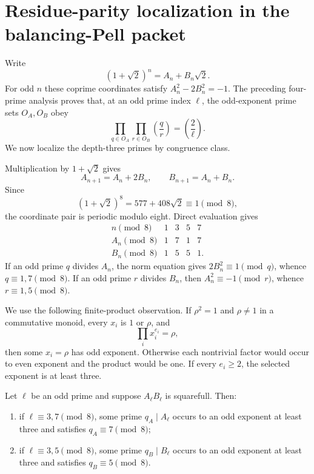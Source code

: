 \section{Residue-parity localization in the balancing-Pell packet}
\label{sec:pell-residue-parity-localization}

Write
\[
 (1+\sqrt2)^n=A_n+B_n\sqrt2 .
\]
For odd $n$ these coprime coordinates satisfy
$A_n^2-2B_n^2=-1$.  The preceding four-prime analysis proves that, at an
odd prime index $\ell$, the odd-exponent prime sets $O_A,O_B$ obey
\begin{equation}\label{eq:pell-cross-character-product-recalled}
 \prod_{q\in O_A}\prod_{r\in O_B}
       \left(\frac qr\right)=\left(\frac2\ell\right).
\end{equation}
We now localize the depth-three primes by congruence class.

Multiplication by $1+\sqrt2$ gives
\[
 A_{n+1}=A_n+2B_n,\qquad B_{n+1}=A_n+B_n.
\]
Since
\[
 (1+\sqrt2)^8=577+408\sqrt2\equiv1\pmod8,
\]
the coordinate pair is periodic modulo eight.  Direct evaluation gives
\begin{equation}\label{eq:pell-mod-eight-table}
\begin{array}{c|cccc}
n\pmod8&1&3&5&7\\ \hline
A_n\pmod8&1&7&1&7\\
B_n\pmod8&1&5&5&1.
\end{array}
\end{equation}
If an odd prime $q$ divides $A_n$, the norm equation gives
$2B_n^2\equiv1\pmod q$, whence $q\equiv1,7\pmod8$.  If an odd prime $r$
divides $B_n$, then $A_n^2\equiv-1\pmod r$, whence
$r\equiv1,5\pmod8$.

We use the following finite-product observation.  If $\rho^2=1$ and
$\rho\ne1$ in a commutative monoid, every $x_i$ is $1$ or $\rho$, and
\[
                       \prod_i x_i^{e_i}=\rho,
\]
then some $x_i=\rho$ has odd exponent.  Otherwise each nontrivial factor
would occur to even exponent and the product would be one.  If every
$e_i\ge2$, the selected exponent is at least three.

\begin{theorem}
\label{thm:pell-forced-residue-depth-three}
Let $\ell$ be an odd prime and suppose $A_\ell B_\ell$ is squarefull.
Then:
\begin{enumerate}
\item if $\ell\equiv3,7\pmod8$, some prime $q_A\mid A_\ell$ occurs to an
odd exponent at least three and satisfies $q_A\equiv7\pmod8$;
\item if $\ell\equiv3,5\pmod8$, some prime $q_B\mid B_\ell$ occurs to an
odd exponent at least three and satisfies $q_B\equiv5\pmod8$.
\end{enumerate}
\end{theorem}

